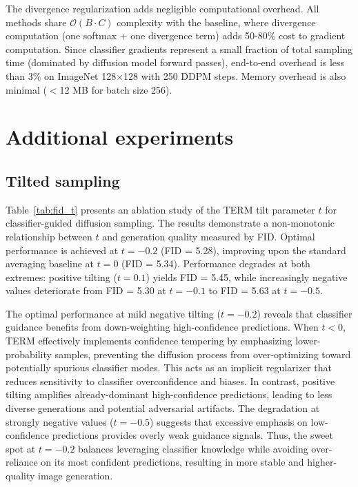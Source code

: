 \documentclass{article}
\begin{document}
The divergence regularization adds negligible computational overhead. All methods share $\mathcal{O}(B \cdot C)$ complexity with the baseline, where divergence computation (one softmax + one divergence term) adds 50-80\% cost to gradient computation. Since classifier gradients represent a small fraction of total sampling time (dominated by diffusion model forward passes), end-to-end overhead is less than 3\% on ImageNet 128$\times$128 with 250 DDPM steps. Memory overhead is also minimal ($<$12 MB for batch size 256).

\section{Additional experiments} \label{addexp}


\subsection{Tilted sampling}
Table~\ref{tab:fid_t} presents an ablation study of the TERM tilt parameter $t$ for classifier-guided diffusion sampling. The results demonstrate a non-monotonic relationship between $t$ and generation quality measured by FID. Optimal performance is achieved at $t = -0.2$ (FID = 5.28), improving upon the standard averaging baseline at $t = 0$ (FID = 5.34). Performance degrades at both extremes: positive tilting ($t = 0.1$) yields FID = 5.45, while increasingly negative values deteriorate from FID = 5.30 at $t = -0.1$ to FID = 5.63 at $t = -0.5$.


The optimal performance at mild negative tilting ($t = -0.2$) reveals that classifier guidance benefits from down-weighting high-confidence predictions. When $t < 0$, TERM effectively implements confidence tempering by emphasizing lower-probability samples, preventing the diffusion process from over-optimizing toward potentially spurious classifier modes. This acts as an implicit regularizer that reduces sensitivity to classifier overconfidence and biases. In contrast, positive tilting amplifies already-dominant high-confidence predictions, leading to less diverse generations and potential adversarial artifacts. The degradation at strongly negative values ($t = -0.5$) suggests that excessive emphasis on low-confidence predictions provides overly weak guidance signals. Thus, the sweet spot at $t = -0.2$ balances leveraging classifier knowledge while avoiding over-reliance on its most confident predictions, resulting in more stable and higher-quality image generation.
\end{document}

